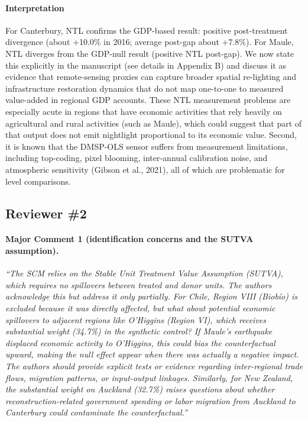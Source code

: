 \paragraph{Interpretation}
For Canterbury, NTL confirms the GDP-based result: positive post-treatment divergence (about +10.0\% in 2016; average post-gap about +7.8\%). For Maule, NTL diverges from the GDP-null result (positive NTL post-gap). We now state this explicitly in the manuscript (see details in Appendix B) and discuss it as evidence that remote-sensing proxies can capture broader spatial re-lighting and infrastructure restoration dynamics that do not map one-to-one to measured value-added in regional GDP accounts. These NTL measurement problems are especially acute in regions that have economic activities that rely heavily on agricultural and rural activities (such as Maule), which could suggest that part of that output does not emit nightlight proportional to its economic value. Second, it is known that the DMSP-OLS sensor suffers from measurement limitations, including top-coding, pixel blooming, inter-annual calibration noise, and atmospheric sensitivity (Gibson et al., 2021), all of which are problematic for level comparisons. 

\newpage 

\subsection*{Reviewer \#2}

\paragraph{Major Comment 1 (identification concerns and the SUTVA assumption).}
\textit{``The SCM relies on the Stable Unit Treatment Value Assumption (SUTVA), which requires no spillovers between treated and donor units. The authors acknowledge this but address it only partially. For Chile, Region VIII (Biobío) is excluded because it was directly affected, but what about potential economic spillovers to adjacent regions like O'Higgins (Region VI), which receives substantial weight (34.7\%) in the synthetic control? If Maule's earthquake displaced economic activity to O'Higgins, this could bias the counterfactual upward, making the null effect appear when there was actually a negative impact. The authors should provide explicit tests or evidence regarding inter-regional trade flows, migration patterns, or input-output linkages. Similarly, for New Zealand, the substantial weight on Auckland (32.7\%) raises questions about whether reconstruction-related government spending or labor migration from Auckland to Canterbury could contaminate the counterfactual.''}

